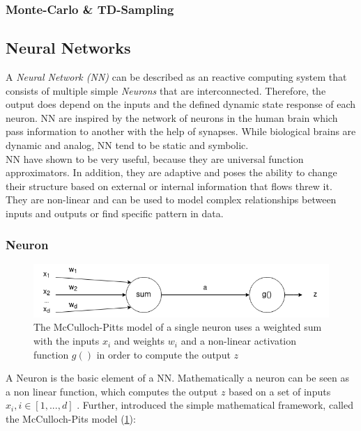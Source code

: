 \subsubsection{Monte-Carlo \& TD-Sampling}


\newpage

\subsection{Neural Networks} \label{sec:NN}
A \emph{Neural Network (NN)} can be described as an reactive computing system that consists of multiple simple \emph{Neurons} that are interconnected. Therefore, the output does depend on the inputs and the defined dynamic state response of each neuron. NN are inspired by the network of neurons in the human brain which pass information to another with the help of synapses. While biological brains are dynamic and analog, NN tend to be static and symbolic.\\
NN have shown to be very useful, because they are universal function approximators. In addition, they are adaptive
and poses the ability to change their structure based on external or internal information that flows threw it. They are non-linear and can be used to model complex relationships between inputs and outputs or find specific pattern in data.

\subsubsection{Neuron}
\begin{figure}
	\centering
	\includegraphics[width=0.8 \linewidth]{figures/neuron.png}
	\caption{The McCulloch-Pitts model of a single neuron uses a weighted sum with the inputs $x_i$ and weights $w_i$ and a non-linear activation function $g()$ in order to compute the output $z$ \cite{10.1063/1.1144830}}
	\label{fig:neuron}
\end{figure}
A Neuron is the basic element of a NN. Mathematically a neuron can be seen as a non linear function, which computes the output $z$ based on a set of inputs $x_i, i \in [1,...,d]$ \cite{10.1063/1.1144830}. Further,  \cite{mcculloch1943logical} introduced the simple mathematical framework, called the McCulloch-Pits model (\cref{fig:neuron}):

